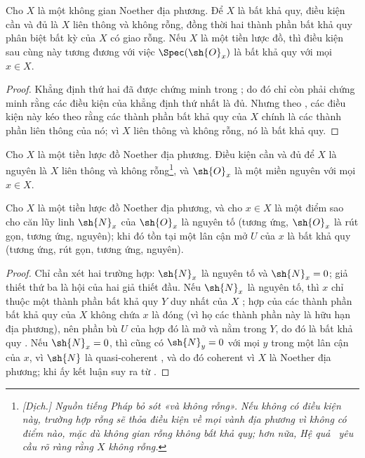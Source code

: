 \documentclass[oneside]{amsart}
\let\EGAOriginalLabel\label
\renewcommand{\label}[1]{\phantomsection\EGAOriginalLabel{#1}}
\begin{document}
\begin{corollary}[6.1.11]
\label{I.6.1.11}
Cho $X$ là một không gian Noether địa phương. Để $X$ là bất khả quy, điều kiện
cần và đủ là $X$ liên thông và không rỗng, đồng thời hai thành phần bất khả quy
phân biệt bất kỳ của $X$ có giao rỗng. Nếu $X$ là một tiền lược đồ, thì điều
kiện sau cùng này tương đương với việc $\Spec(\sh{O}_x)$ là bất khả quy với mọi
$x\in X$.
\end{corollary}

\begin{proof}
Khẳng định thứ hai đã được chứng minh trong ; do đó chỉ còn phải
chứng minh rằng các điều kiện của khẳng định thứ nhất là đủ. Nhưng theo
, các điều kiện này kéo theo rằng các thành phần bất khả quy của
$X$ chính là các thành phần liên thông của nó; vì $X$ liên thông và không rỗng,
nó là bất khả quy.
\end{proof}

\begin{corollary}[6.1.12]
\label{I.6.1.12}
Cho $X$ là một tiền lược đồ Noether địa phương. Điều kiện cần và đủ để $X$ là
nguyên là $X$ liên thông và không rỗng\footnote{\emph{[Dịch.] Nguồn tiếng
Pháp bỏ sót «và không rỗng». Nếu không có điều kiện này, trường hợp rỗng sẽ
thỏa điều kiện về mọi vành địa phương vì không có điểm nào, mặc dù không gian
rỗng không bất khả quy; hơn nữa, Hệ quả~ yêu cầu rõ ràng rằng
$X$ không rỗng.}}, và $\sh{O}_x$ là một miền nguyên với mọi $x\in X$.
\end{corollary}

\begin{proposition}[6.1.13]
\label{I.6.1.13}
Cho $X$ là một tiền lược đồ Noether địa phương, và cho $x\in X$ là một điểm
sao cho căn lũy linh $\sh{N}_x$ của $\sh{O}_x$ là nguyên tố (tương ứng,
$\sh{O}_x$ là rút gọn, tương ứng, nguyên); khi đó tồn tại một lân cận mở $U$
của $x$ là bất khả quy (tương ứng, rút gọn, tương ứng, nguyên).
\end{proposition}

\begin{proof}
Chỉ cần xét hai trường hợp: $\sh{N}_x$ là nguyên tố và $\sh{N}_x=0$; giả
thiết thứ ba là hội của hai giả thiết đầu. Nếu $\sh{N}_x$ là nguyên tố, thì
$x$ chỉ thuộc một thành phần bất khả quy $Y$ duy nhất của $X$
; hợp của các thành phần bất khả quy của $X$ không chứa $x$ là
đóng (vì họ các thành phần này là hữu hạn địa phương), nên phần bù $U$ của hợp
đó là mở và nằm trong $Y$, do đó là bất khả quy . Nếu
$\sh{N}_x=0$, thì cũng có $\sh{N}_y=0$ với mọi $y$ trong một lân cận của $x$,
vì $\sh{N}$ là quasi-coherent , và do đó coherent vì $X$ là
Noether địa phương; khi ấy kết luận suy ra từ .
\end{proof}
\end{document}
